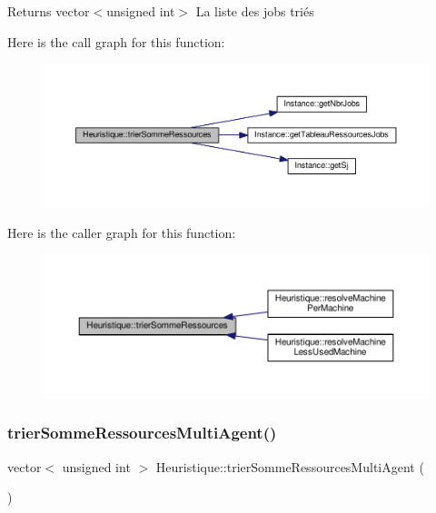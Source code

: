 \begin{DoxyReturn}{Returns}
vector$<$unsigned int$>$ La liste des jobs triés 
\end{DoxyReturn}
Here is the call graph for this function\+:
\nopagebreak
\begin{figure}[H]
\begin{center}
\leavevmode
\includegraphics[width=350pt]{classHeuristique_a6101d6d238a7667b820b50629e4d497f_cgraph}
\end{center}
\end{figure}
Here is the caller graph for this function\+:
\nopagebreak
\begin{figure}[H]
\begin{center}
\leavevmode
\includegraphics[width=350pt]{classHeuristique_a6101d6d238a7667b820b50629e4d497f_icgraph}
\end{center}
\end{figure}
\mbox{\label{classHeuristique_aadc8e02ca8aa127354993bb01910bcef}} 
\subsubsection{\texorpdfstring{trier\+Somme\+Ressources\+Multi\+Agent()}{trierSommeRessourcesMultiAgent()}}
{\footnotesize\ttfamily vector$<$ unsigned int $>$ Heuristique\+::trier\+Somme\+Ressources\+Multi\+Agent (\begin{DoxyParamCaption}{ }\end{DoxyParamCaption})}



